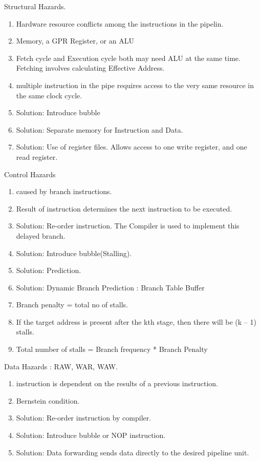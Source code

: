 \begin{enumerate}
    \item Structural Hazards.
    \begin{enumerate}
        \item Hardware resource conflicts among the instructions in the pipelin.
        \item Memory, a GPR Register, or an ALU
        \item Fetch cycle and Execution cycle both may need ALU at the same time. Fetching involves calculating Effective Address.
        \item multiple instruction in the pipe requires access to the very same resource in the same clock cycle.
        \item Solution: Introduce bubble
        \item Solution: Separate memory for Instruction and Data.
        \item Solution: Use of register files. Allows access to one write register, and one read register.
    \end{enumerate}

    \item Control Hazards
    \begin{enumerate}
        \item caused by branch instructions.
        \item Result of instruction determines the next instruction to be executed.
        \item Solution: Re-order instruction. The Compiler is used to implement this delayed branch.
        \item Solution: Introduce bubble(Stalling).
        \item Solution: Prediction.
        \item Solution: Dynamic Branch Prediction : Branch Table Buffer
        \item Branch penalty = total no of stalls.
        \item If the target address is present after the kth stage, then there will be (k – 1) stalls.
        \item Total number of stalls = Branch frequency * Branch Penalty
    \end{enumerate}

    \begin{minipage}{\linewidth}
    \item Data Hazards : RAW, WAR, WAW.
    \begin{enumerate}
        \item instruction is dependent on the results of a previous instruction.
        \item Bernstein condition.
        \item Solution: Re-order instruction by compiler.
        \item Solution: Introduce bubble or NOP instruction.
        \item Solution: Data forwarding sends data directly to the desired pipeline unit.
    \end{enumerate}


\end{minipage}
\end{enumerate}
